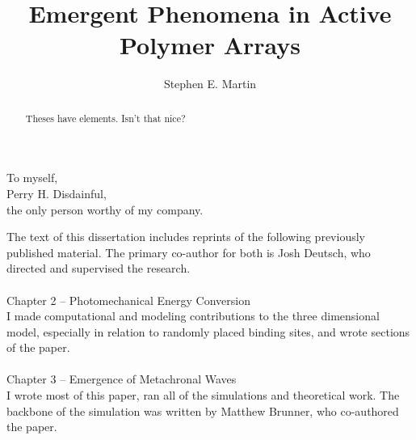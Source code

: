 \documentclass[11pt]{ucthesis}
\begin{document}

\title{Emergent Phenomena in Active Polymer Arrays}
\author{Stephen E. Martin}
\deanlinethree{}

\begin{frontmatter}

\maketitle
\copyrightpage

\tableofcontents
\listoffigures

\begin{abstract}
Theses have elements.  Isn't that nice?

\end{abstract}

\begin{dedication}
\null\vfil
{\large
\begin{center}
To myself,\\\vspace{12pt}
Perry H. Disdainful,\\\vspace{12pt}
the only person worthy of my company.
\end{center}}
\vfil\null
\end{dedication}


\begin{acknowledgements}
The text of this dissertation includes
reprints of the following previously published material. The primary co-author for both is Josh Deutsch, who directed and supervised the research.\\ \\
Chapter 2 -- Photomechanical Energy Conversion \cite{deutsch2015photomechanical}\\
I made computational and modeling contributions to the three dimensional model, especially in relation to randomly placed binding sites, and wrote sections of the paper.\\ \\
Chapter 3 -- Emergence of Metachronal Waves \cite{martin2018emergence}\\
I wrote most of this paper, ran all of the simulations and theoretical work. The backbone of the simulation was written by Matthew Brunner, who co-authored the paper. 
\end{acknowledgements}

\end{frontmatter}
\end{document}

